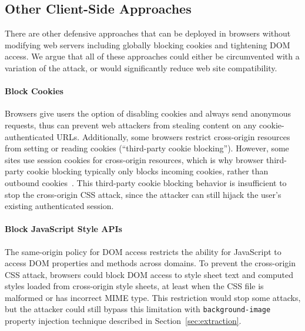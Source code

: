 \documentclass{acm_proc_article-sp}
\begin{document}
\subsection{Other Client-Side Approaches}
There are other defensive approaches that can be deployed in browsers without modifying web servers including globally blocking cookies and tightening DOM access.  We argue that all of these approaches could either be circumvented with a variation of the attack, or would significantly reduce web site compatibility.

\paragraph{Block Cookies}
Browsers give users the option of disabling cookies
and always send anonymous requests, thus can prevent web attackers from
stealing content on any cookie-authenticated URLs. Additionally, some browsers
restrict cross-origin resources from setting or reading cookies (``third-party
cookie blocking''). However, some sites use session cookies for cross-origin
resources, which is why browser third-party cookie blocking typically only
blocks incoming cookies, rather than outbound
cookies~\cite{jackson06thirdpartycookies}. This third-party cookie blocking
behavior is insufficient to stop the cross-origin CSS attack, since the
attacker can still hijack the user's existing authenticated session.

\paragraph{Block JavaScript Style APIs}
The same-origin policy for DOM access restricts the ability for JavaScript to
access DOM properties and methods across domains. To prevent the cross-origin
CSS attack, browsers could block DOM access to style sheet text and computed
styles loaded from cross-origin style sheets, at least when the CSS file is
malformed or has incorrect MIME type. This restriction would stop some
attacks, but the attacker could still bypass this limitation with
\texttt{background-image} property injection technique described in
Section~\ref{sec:extraction}.

\end{document}
